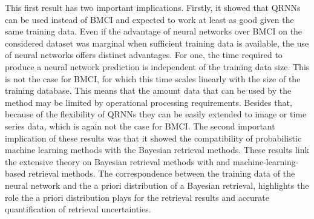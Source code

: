 This first result has two important implications. Firstly, it showed that QRNNs
can be used instead of BMCI and expected to work at least as good given the same
training data. Even if the advantage of neural networks over BMCI on the
considered dataset was marginal when sufficient training data is available, the
use of neural networks offers distinct advantages. For one, the time required to
produce a neural network prediction is independent of the training data size.
This is not the case for BMCI, for which this time scales linearly with the size
of the training database. This means that the amount data that can be used by
the method may be limited by operational processing requirements. Besides that,
because of the flexibility of QRNNs they can be easily extended to image or time
series data, which is again not the case for BMCI. The second important
implication of these results was that it showed the compatibility of
probabilistic machine learning methods with the Bayesian retrieval methods.
These results link the extensive theory on Bayesian retrieval methods
\citep{rodgers00, tarantola05} with and machine-learning-based retrieval
methods. The correspondence between the training data of the neural network and
the a priori distribution of a Bayesian retrieval, highlights the role the a
priori distribution plays for the retrieval results and accurate quantification
of retrieval uncertainties.


